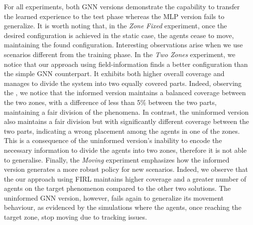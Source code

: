 \documentclass[conference]{IEEEtran}
\begin{document}
For all experiments, both \ac{GNN} versions demonstrate the capability to transfer the learned experience to the test phase whereas the MLP version fails to generalize. 
%
It is worth noting that, in the \emph{Zone Fixed} experiment, %
 once the desired configuration is achieved in the static case, 
 the agents cease to move, maintaining the found configuration.
%
Interesting observations arise when we use scenarios different from the training phase. 
In the \emph{Two Zones} experiment,
 we notice that our approach using field-information finds a better configuration than the simple GNN counterpart. 
%
It exhibits both higher overall coverage and manages to divide the system into two equally covered parts. 
%
Indeed, observing the , we notice that the informed version maintains a balanced coverage between the two zones, 
 with a difference of less than 5\% between the two parts, maintaining a fair division of the phenomena.
%
In contrast, the uninformed version also maintains a fair division but with significantly different coverage between the two parts, 
 indicating a wrong placement among the agents in one of the zones.
%
This is a consequence of the uninformed version's inability to encode the necessary information to divide the agents into two zones, therefore it is not able to generalise.
%
Finally, the \emph{Moving} experiment emphasizes how the informed version generates a more robust policy for new scenarios. 
 Indeed, we observe that the our approach using \ac{FIRL} maintains higher coverage and a greater number of agents on the target phenomenon compared to the other two solutions.
%
The uninformed GNN version, however, 
 fails again to generalize its movement behaviour, as evidenced by the simulations where the agents, once reaching the target zone, stop moving due to tracking issues.
\end{document}
